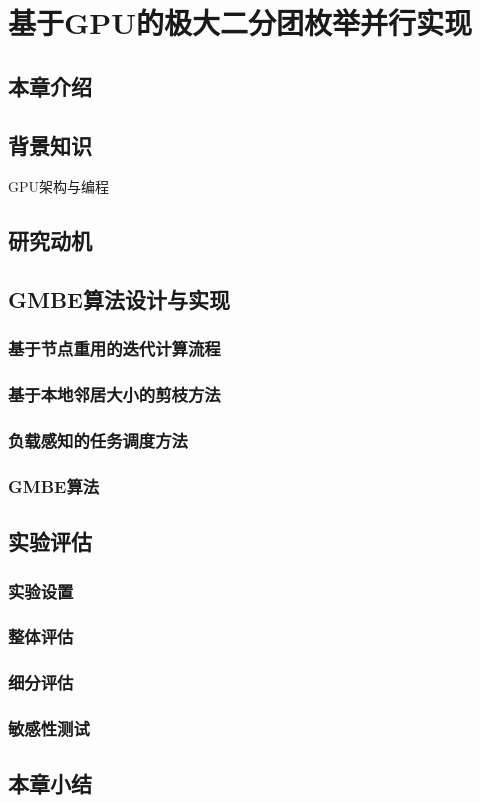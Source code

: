 \chapter{基于GPU的极大二分团枚举并行实现}
\label{ch:gmbe}

\section{本章介绍}
\section{背景知识}
GPU架构与编程

\section{研究动机}

\section{GMBE算法设计与实现}

\subsection{基于节点重用的迭代计算流程}

\subsection{基于本地邻居大小的剪枝方法}

\subsection{负载感知的任务调度方法}

\subsection{GMBE算法}

\section{实验评估}

\subsection{实验设置}

\subsection{整体评估}

\subsection{细分评估}

\subsection{敏感性测试}

\section{本章小结}